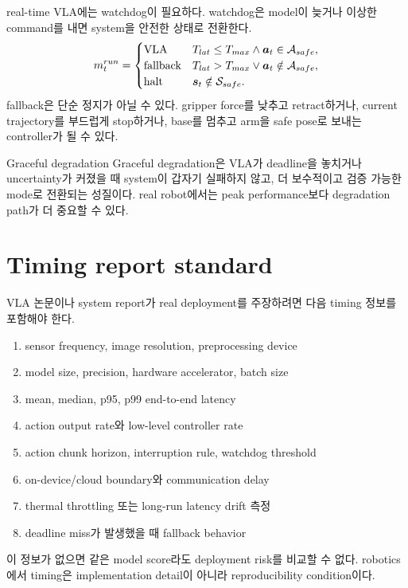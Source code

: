 real-time VLA에는 watchdog이 필요하다. watchdog은 model이 늦거나 이상한 command를 내면 system을 안전한 상태로 전환한다.
\begin{equation}
  m_t^{run}
  =
  \begin{cases}
  \mathrm{VLA} & T_{lat} \leq T_{max} \wedge \bm{a}_t \in \mathcal{A}_{safe}, \\
  \mathrm{fallback} & T_{lat} > T_{max} \vee \bm{a}_t \notin \mathcal{A}_{safe}, \\
  \mathrm{halt} & \bm{s}_t \notin \mathcal{S}_{safe}.
  \end{cases}
  \label{eq:ch18-watchdog}
\end{equation}
fallback은 단순 정지가 아닐 수 있다. gripper force를 낮추고 retract하거나, current trajectory를 부드럽게 stop하거나, base를 멈추고 arm을 safe pose로 보내는 controller가 될 수 있다.

\begin{definitionbox}{Graceful degradation}
Graceful degradation은 VLA가 deadline을 놓치거나 uncertainty가 커졌을 때 system이 갑자기 실패하지 않고, 더 보수적이고 검증 가능한 mode로 전환되는 성질이다. real robot에서는 peak performance보다 degradation path가 더 중요할 수 있다.
\end{definitionbox}

\section{Timing report standard}

VLA 논문이나 system report가 real deployment를 주장하려면 다음 timing 정보를 포함해야 한다.
\begin{enumerate}
  \item sensor frequency, image resolution, preprocessing device
  \item model size, precision, hardware accelerator, batch size
  \item mean, median, p95, p99 end-to-end latency
  \item action output rate와 low-level controller rate
  \item action chunk horizon, interruption rule, watchdog threshold
  \item on-device/cloud boundary와 communication delay
  \item thermal throttling 또는 long-run latency drift 측정
  \item deadline miss가 발생했을 때 fallback behavior
\end{enumerate}

이 정보가 없으면 같은 model score라도 deployment risk를 비교할 수 없다. robotics에서 timing은 implementation detail이 아니라 reproducibility condition이다.

